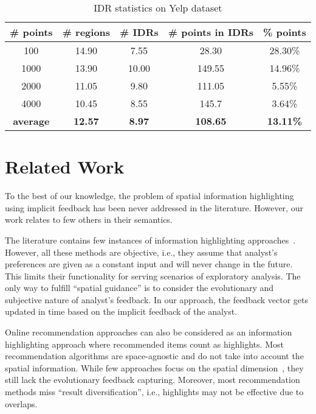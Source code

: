 \documentclass[sigconf,edbt]{acmart-edbt2019}
\begin{document}
\begin{table}[h]
\centering
\caption{IDR statistics on Yelp dataset}
\label{tbl:yelp}
\begin{tabular}{|c|c|c|c|c|}
\cline{1-5}
\textbf{\# points}  & \textbf{\# regions} 	& \textbf{\# IDRs} 	& \textbf{\# points in IDRs}	& \textbf{\%  points}	\\ \hline
\multicolumn{1}{|c|}{100} 				& 14.90            	& 7.55	          	& 28.30             & 28.30\%            
 \\ \hline
\multicolumn{1}{|c|}{1000} 				& 13.90         	& 10.00	          	& 149.55             & 14.96\%              \\ \hline
\multicolumn{1}{|c|}{2000} 				& 11.05         	& 9.80         	& 111.05             & 5.55\%              \\ \hline
\multicolumn{1}{|c|}{4000} 				& 10.45          	& 8.55	          	& 145.7              & 3.64\%              \\ \hline
\multicolumn{1}{|c|}{\textbf{average}} 				& \textbf{12.57}           	& \textbf{8.97}	          	& \textbf{108.65}              & \textbf{13.11\%}              \\ \hline
\end{tabular}
\end{table}

\section{Related Work}
\label{sec:rel}
To the best of our knowledge, the problem of spatial information highlighting using implicit feedback has been never addressed in the literature. However, our work relates to few others in their semantics.

\vspace{3pt}
 The literature contains few instances of information highlighting approaches~\cite{Liang2010,Robinson2011,wongsuphasawat2016voyager,willett2007scented}. However, all these methods are objective, i.e., they 	assume that analyst's preferences are given as a constant input and will never change in the future. This limits their functionality for serving scenarios of exploratory analysis. The only way to fulfill ``spatial guidance'' is to consider the evolutionary and subjective nature of analyst's feedback. In our approach, the feedback vector gets updated in time based on the implicit feedback of the analyst.

\vspace{2pt}
Online recommendation approaches can also be considered as an information highlighting approach where recommended items count as highlights. Most recommendation algorithms are space-agnostic and do not take into account the spatial information. While few approaches focus on the spatial dimension~\cite{Bao2015,Levandoski:2012,DrosouP12}, they still lack the evolutionary feedback capturing. Moreover, most recommendation methods miss ``result diversification'', i.e., highlights may not be effective due to overlaps.
\end{document}

